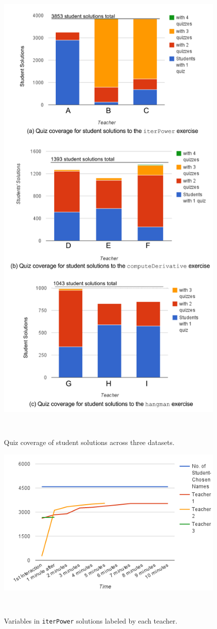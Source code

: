 \begin{figure}
\begin{minipage}{1\columnwidth}
\centering
\includegraphics[width=0.7\columnwidth]{Body/figures/foobaz/ComboQuizCoverageFigure2.png}
\caption{Quiz coverage of student solutions across three datasets.}~\label{fig:comboquizcoverage}

\end{minipage}
\end{figure}
\begin{figure}
\begin{minipage}{1\columnwidth}

\centering
\includegraphics[width=0.9\columnwidth]{Body/figures/foobaz/variableCoverageNoTitle.png}
\caption{Variables in \texttt{iterPower} solutions labeled by each teacher.}~\label{fig:variableCoverage}
\end{minipage}
\end{figure}
